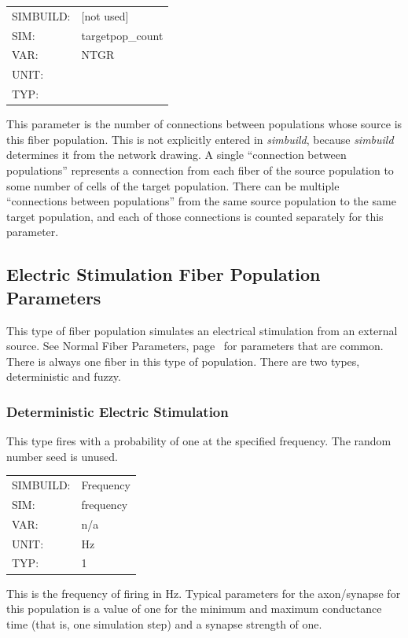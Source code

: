\documentclass[12pt,openany,oneside]{book}
\newcommand{\tiref}[1]{#1, page~\pageref{#1}}
\newcommand{\prog}[1]{\textit{{#1}}}
\newcommand{\inquotes}[1]{{{``#1''}}}
\begin{document}
\begin{flushleft}
\begin{tabular}{@{}ll@{}}
SIMBUILD: & [not used]\\
SIM: & targetpop\_count\\
VAR: & NTGR\\
UNIT: &\\
TYP: &\\
\end{tabular}
\end{flushleft}
\noindent
This parameter is the number of connections between populations whose
source is this fiber population. This is not explicitly entered 
in \prog{simbuild}, because \prog{simbuild} determines it from the network drawing. A
single \inquotes{connection between populations} represents a connection from
each fiber of the source population to some number of cells of the
target population. There can be multiple \inquotes{connections between
populations} from the same source population to the same target
population, and each of those connections is counted separately for
this parameter.
\filbreak
\vspace{\baselineskip}

\subsection{Electric Stimulation Fiber Population Parameters}
\label{Electric Stimulation Fiber Population Parameters}
\noindent
This type of fiber population simulates an electrical stimulation from an
external source. See \tiref{Normal Fiber Parameters} for parameters that
are common. There is always one fiber in this type of population. There are 
two types, deterministic and fuzzy.

\subsubsection{Deterministic Electric Stimulation}
\label{Deterministic Electric Stimulation}
This type fires with a probability of one at the specified frequency. The
random number seed is unused.
\begin{flushleft}
\begin{tabular}{@{}ll@{}}
SIMBUILD: & Frequency\\
SIM: & frequency\\
VAR: & n/a\\
UNIT: & Hz\\
TYP: & 1\\
\end{tabular}
\end{flushleft}
\noindent
This is the frequency of firing in Hz. Typical parameters for the
axon/synapse for this population is a value of one for the minimum and maximum 
conductance time (that is, one simulation step) and a synapse strength
of one.
\filbreak
\vspace{\baselineskip}
\end{document}
